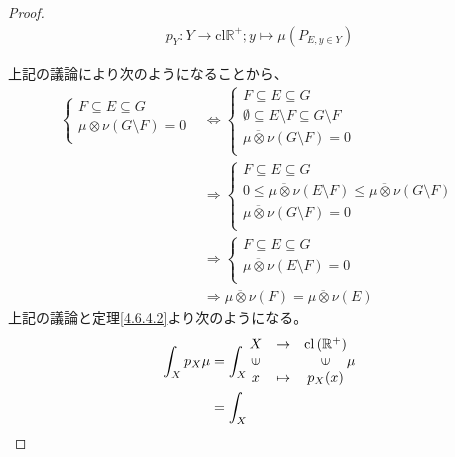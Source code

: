 \documentclass[dvipdfmx]{jsarticle}
\begin{document}
\begin{proof}
\begin{align*}
p_{Y}:Y \rightarrow \mathrm{cl}\mathbb{R}^{+};y \mapsto \mu\left( P_{E,y \in Y} \right)
\end{align*}\par
上記の議論により次のようになることから、
\begin{align*}
\left\{ \begin{matrix}
F \subseteq E \subseteq G \\
\mu \otimes \nu(G \setminus F) = 0 \\
\end{matrix} \right. &\Leftrightarrow \left\{ \begin{matrix}
F \subseteq E \subseteq G \\
\emptyset \subseteq E \setminus F \subseteq G \setminus F \\
\overline{\mu \otimes \nu}(G \setminus F) = 0 \\
\end{matrix} \right.\ \\
&\Rightarrow \left\{ \begin{matrix}
F \subseteq E \subseteq G \\
0 \leq \overline{\mu \otimes \nu}(E \setminus F) \leq \overline{\mu \otimes \nu}(G \setminus F) \\
\overline{\mu \otimes \nu}(G \setminus F) = 0 \\
\end{matrix} \right.\ \\
&\Rightarrow \left\{ \begin{matrix}
F \subseteq E \subseteq G \\
\overline{\mu \otimes \nu}(E \setminus F) = 0 \\
\end{matrix} \right.\ \\
&\Rightarrow \overline{\mu \otimes \nu}(F) = \overline{\mu \otimes \nu}(E)
\end{align*}
上記の議論と定理\ref{4.6.4.2}より次のようになる。
\begin{align*}
\int_{X} {p_{X}\mu} &= \int_{X} {\begin{matrix}
X & \rightarrow & \mathrm{cl}\left( \mathbb{R}^{+} \right) \\
\text{\rotatebox[origin=c]{90}{$\in$}} & & \text{\rotatebox[origin=c]{90}{$\in$}} \\
x & \mapsto & p_{X}(x) \\
\end{matrix}\mu}\\
&= \int_{X} {\begin{matrix}

\end{matrix}}
\end{align*}
\end{proof}
\end{document}
